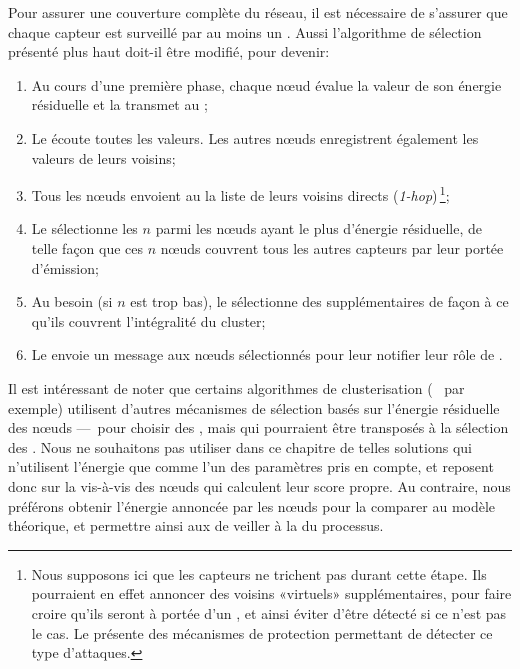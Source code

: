 Pour assurer une couverture complète du réseau, il est nécessaire de s'assurer que chaque capteur est surveillé par au moins un \cn.
Aussi l'algorithme de sélection présenté plus haut doit-il être modifié, pour devenir:
\begin{enumerate}
    \item Au cours d'une première phase, chaque nœud évalue la valeur de son énergie résiduelle et la transmet au \ch;
    \item Le \ch écoute toutes les valeurs. Les autres nœuds enregistrent également les valeurs de leurs voisins;
    \item Tous les nœuds envoient au \CH la liste de leurs voisins directs (\textit{1-hop})\,\footnote{Nous supposons ici que les capteurs ne trichent pas durant cette étape. Ils pourraient en effet annoncer des voisins «virtuels» supplémentaires, pour faire croire qu'ils seront à portée d'un \cn, et ainsi éviter d'être détecté si ce n'est pas le cas. Le  présente des mécanismes de protection permettant de détecter ce type d'attaques.};
    \item Le \CH sélectionne les $n$ \cns parmi les nœuds ayant le plus d'énergie résiduelle, de telle façon que ces $n$ nœuds couvrent tous les autres capteurs par leur portée d'émission;
    \item Au besoin (si $n$ est trop bas), le \CH sélectionne des \cns supplémentaires de façon à ce qu'ils couvrent l'intégralité du cluster;
    \item Le \CH envoie un message aux nœuds sélectionnés pour leur notifier leur rôle de \cn.
\end{enumerate}

Il est intéressant de noter que certains algorithmes de clusterisation (\heed~\cite{YF04} par exemple) utilisent d'autres mécanismes de sélection basés sur l'énergie résiduelle des nœuds ---~pour choisir des \chs, mais qui pourraient être transposés à la sélection des \cns.
Nous ne souhaitons pas utiliser dans ce chapitre de telles solutions qui n'utilisent l'énergie que comme l'un des paramètres pris en compte, et reposent donc sur la  vis-à-vis des nœuds qui calculent leur score propre.
Au contraire, nous préférons obtenir l'énergie annoncée par les nœuds pour la comparer au modèle théorique, et permettre ainsi aux \vns de veiller à la \secu du processus.

